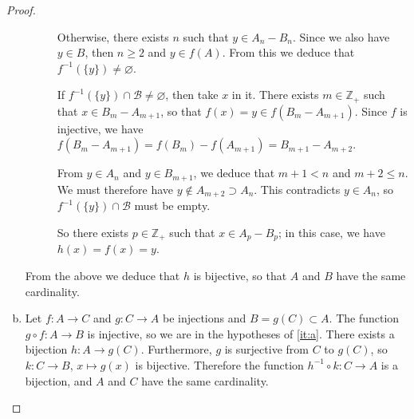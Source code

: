 \documentclass[11pt,a4paper,twoside]{article}
\theoremstyle{definition}
\begin{document}
\begin{proof}
\begin{enumerate}[(a)]
\begin{description}
      Otherwise, there exists $n$ such that $y \in A_n - B_n$. Since we also have $y \in B$, then $n \geq 2$ and $y \in f (A)$.
      From this we deduce that $f^{-1} ( \{ y \} ) \neq \varnothing$.

      If $f^{-1} ( \{ y \} ) \cap \mathscr{B} \neq \varnothing$, then take $x$ in it.
      There exists $m \in \mathbb{Z}_+$ such that $x \in B_m - A_{m + 1}$, so that $f (x) = y \in f (B_m - A_{m + 1})$.
      Since $f$ is injective, we have $f (B_m - A_{m + 1}) = f (B_m) - f (A_{m + 1}) = B_{m + 1} - A_{m + 2}$.

      From $y \in A_n$ and $y \in B_{m + 1}$, we deduce that $m + 1 < n$ and $m + 2 \leq n$. We must therefore have
      $y \notin A_{m + 2} \supset A_n$. This contradicts $y \in A_n$, so $f^{-1} ( \{ y \} ) \cap \mathscr{B}$ must be empty.

      So there exists $p \in \mathbb{Z}_+$ such that $x \in A_p - B_p$; in this case, we have $h (x) = f (x) = y$.

    \end{description}

    From the above we deduce that $h$ is bijective, so that $A$ and $B$ have the same cardinality.

  \item Let $f : A \to C$ and $g : C \to A$ be injections and $B = g (C) \subset A$.
    The function $g \circ f : A \to B$ is injective, so we are in the hypotheses of \ref{it:a}.
    There exists a bijection $h : A \to g (C)$. Furthermore, $g$ is surjective from $C$ to $g (C)$,
    so $k : C \to B$, $x \mapsto g (x)$ is bijective. Therefore the function $h^{-1} \circ k : C \to A$
    is a bijection, and $A$ and $C$ have the same cardinality.

  \end{enumerate}

\end{proof}
\end{document}
